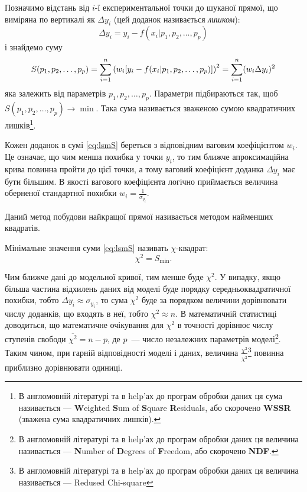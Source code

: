 \documentclass{LabBook}
\begin{document}
  Позначимо відстань від $i$-ї експериментальної точки до шуканої прямої, що виміряна по вертикалі як $\Delta y_i$ (цей доданок називається \emph{лишком}):
  \begin{equation*}\label{eq:SR}
    \Delta y_i = y_i - f(x_i| p_1, p_2, \ldots, p_p)
  \end{equation*}
  і знайдемо суму
  \begin{equation}\label{eq:lsmS}
    S(p_1, p_2, \ldots, p_p) = \sum\limits_{i = 1}^n  \left( w_i [y_i - f(x_i| p_1, p_2, \ldots, p_p)] \right)^2 = \sum\limits_{i = 1}^n (w_i\Delta y_i)^2
  \end{equation}
  яка залежить від параметрів $p_1, p_2, \ldots, p_p$. Параметри підбираються так, щоб $S(p_1, p_2, \ldots, p_p) \to \min$. Така сума називається зваженою сумою квадратичних лишків\footnote{В англомовній літературі та в help'ах до програм обробки даних ця сума називається --- \textbf{W}eighted \textbf{S}um of \textbf{S}quare \textbf{R}esiduals, або скорочено \textbf{WSSR} (зважена сума квадратичних лишків).}.

  Кожен доданок в сумі \eqref{eq:lsmS} береться з відповідним ваговим коефіцієнтом $w_i$. Це означає, що чим менша похибка у точки $y_i$, то тим ближче апроксимаційна крива повинна пройти до цієї точки, а тому ваговий коефіцієнт доданка $\Delta y_i$ має бути більшим. В якості вагового коефіцієнта логічно приймається величина оберненої стандартної похибки $w_i = \frac1{\sigma_{y_i}}$.

  Даний метод побудови найкращої прямої називається методом найменших квадратів.

  Мінімальне значення суми \eqref{eq:lsmS} називать $\chi$-квадрат:
  \begin{equation}\label{eq:defchi}
    \chi^2 = S_{\min}.
  \end{equation}

  Чим ближче дані до модельної кривої, тим менше буде $\chi^2$. У випадку, якщо більша частина відхилень даних від моделі буде порядку середньоквадратичної похибки, тобто $\Delta y_i \approx \sigma_{y_i}$, то сума $\chi^2$ буде за порядком величини дорівнювати числу доданків, що входять в неї, тобто $\chi^2 \approx n$.  В математичній статистиці доводиться, що математичне очікування для $\chi^2$  в точності дорівнює числу ступенів свободи $\overline{\chi^2} = n - p$, де $p$~--- число незалежних параметрів моделі\footnote{В англомовній літературі та в help'ах до програм обробки даних ця величина називається --- \textbf{N}umber of \textbf{D}egrees of \textbf{F}reedom, або скорочено \textbf{NDF}.}. Таким чином, при гарній відповідності моделі і даних, величина $\frac{\chi^2}{\overline{\chi^2}}$\footnote{В англомовній літературі та в help'ах до програм обробки даних ця величина називається --- Redused Chi-square} повинна приблизно дорівнювати одиниці.
\end{document}
